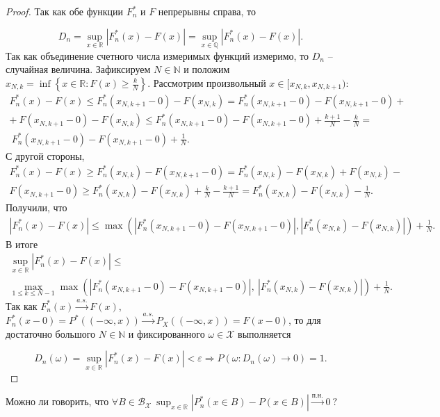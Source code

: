 \begin{proof}
    Так как обе функции $\displaystyle F_{n}^{*}$ и $\displaystyle F$ непрерывны справа, то
    
    
    \begin{equation*}
    	D_{n} =\sup _{x\in \mathbb{R}}\left| F_{n}^{*}( x) -F( x)\right| =\sup _{x\in \mathbb{Q}}\left| F_{n}^{*}( x) -F( x)\right| .
    \end{equation*}
    Так как объединение счетного числа измеримых функций измеримо, то $\displaystyle D_{n}$ -- случайная величина. Зафиксируем $\displaystyle N\in \mathbb{N}$ и положим $\displaystyle x_{N,k} =\inf\left\{x\in \mathbb{R} :F( x) \geqslant \frac{k}{N}\right\}$. Рассмотрим произвольный $\displaystyle x\in [ x_{N,k} ,x_{N,k+1})$:
    \begin{gather*}
    F_{n}^{*}( x) -F( x) \leqslant F_{n}^{*}( x_{N,k+1} -0) -F( x_{N,k}) =F_{n}^{*}( x_{N,k+1} -0) -F( x_{N,k+1} -0) +\\
    +\ F( x_{N,k+1} -0) -F( x_{N,k}) \leqslant F_{n}^{*}( x_{N,k+1} -0) -F( x_{N,k+1} -0) +\frac{k+1}{N} -\frac{k}{N} =\\
    \ F_{n}^{*}( x_{N,k+1} -0) -F( x_{N,k+1} -0) +\frac{1}{N} .
    \end{gather*}
    С другой стороны,
    \begin{gather*}
    F_{n}^{*}( x) -F( x) \geqslant F_n^{*}( x_{N,k}) -F( x_{N,k+1} -0) =F_n^{*}( x_{N,k}) -F( x_{N,k}) +F( x_{N,k}) -\\
    F( x_{N,k+1} -0) \geqslant F_n^{*}( x_{N,k}) -F( x_{N,k}) +\frac{k}{N} -\frac{k+1}{N} =F_n^{*}( x_{N,k}) -F( x_{N,k}) -\frac{1}{N} .
    \end{gather*}
    Получили, что
    \begin{gather*}
    \left| F_{n}^{*}( x) -F( x)\right| \leqslant \max\left(\left| F_{n}^{*}( x_{N,k+1} -0) -F( x_{N,k+1} -0)\right| ,\left| F_n^{*}( x_{N,k}) -F( x_{N,k})\right| \right) + \frac{1}{N}.
    \end{gather*}
    В итоге
    \begin{gather*}
    \sup _{x\in \mathbb{R}}| F^*_{n}( x) -F( x)| \leqslant\\ \max_{1\leqslant k\leqslant N-1}\max\left(\left| F_{n}^{*}( x_{N,k+1} -0) -F( x_{N,k+1} -0)\right|,\ \left| F_n^{*}( x_{N,k}) -F( x_{N,k})\right| \right)+\frac{1}{N} .
    \end{gather*}
    Так как $\displaystyle F_{n}^{*}( x)\xrightarrow{a.s.} F( x)$, $\displaystyle F_n^{*}( x-0) =P^{*}(( -\infty ,x))\xrightarrow{a.s.} P_{X}(( -\infty ,x)) =F( x-0)$, то для достаточно большого $\displaystyle N\in \mathbb{N}$ и фиксированного $\displaystyle \omega \in \mathcal{X}$ выполняется
    
    \begin{equation*}
    D_{n}( \omega ) =\sup _{x\in \mathbb{R}}\left| F_{n}^{*}( x) -F( x)\right| < \varepsilon \Rightarrow P\left( \omega :D_{n}( \omega )\rightarrow 0\right) =1.
    \end{equation*}
\end{proof}

\begin{exercise}
Можно ли говорить, что $\displaystyle \forall B\in \mathcal{B}_{\mathcal{X}} \ \sup _{x\in \mathbb{R}}\left| P_{n}^{*}( x\in B) -P( x\in B)\right| \xrightarrow{п.н.} 0\ ?$
\end{exercise}